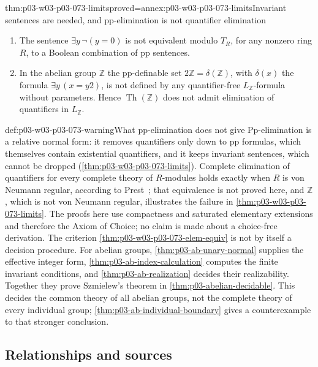 \begin{hbtheorem}{thm:p03-w03-p03-073-limits}{proved=annex:p03-w03-p03-073-limits}{Invariant sentences are needed, and pp-elimination is not quantifier elimination}
\begin{enumerate}
\item The sentence \(\exists y\,\neg(y=0)\) is not equivalent modulo
      \(T_R\), for any nonzero ring \(R\), to a Boolean combination of pp
      sentences.
\item In the abelian group \(\mathbb Z\) the pp-definable set
      \(2\mathbb Z=\delta(\mathbb Z)\), with \(\delta(x)\) the formula
      \(\exists y\,(x=y2)\), is not defined by any quantifier-free
      \(L_{\mathbb Z}\)-formula without parameters. Hence
      \(\operatorname{Th}(\mathbb Z)\) does not admit elimination of
      quantifiers in \(L_{\mathbb Z}\).
\end{enumerate}
\end{hbtheorem}

\begin{hbwarning}{def:p03-w03-p03-073-warning}{What pp-elimination does not give}
Pp-elimination is a relative normal form: it removes quantifiers only down
to pp formulas, which themselves contain existential quantifiers, and it
keeps invariant sentences, which cannot be dropped
(\cref{thm:p03-w03-p03-073-limits}). Complete elimination of quantifiers
for every complete theory of \(R\)-modules holds exactly when \(R\) is von
Neumann regular, according to Prest~\cite[Theorem~5.1]{Prest2020ModelTheoryModules};
that equivalence is not proved here, and \(\mathbb Z\), which is not von
Neumann regular, illustrates the failure in
\cref{thm:p03-w03-p03-073-limits}. The proofs here use compactness and
saturated elementary extensions and therefore the Axiom of Choice; no
claim is made about a choice-free derivation. The criterion
\cref{thm:p03-w03-p03-073-elem-equiv} is not by itself a decision
procedure. For abelian groups, \cref{thm:p03-ab-unary-normal} supplies
the effective integer form, \cref{thm:p03-ab-index-calculation} computes
the finite invariant conditions, and \cref{thm:p03-ab-realization}
decides their realizability. Together they prove Szmielew's theorem in
\cref{thm:p03-abelian-decidable}. This decides the common theory of all
abelian groups, not the complete theory of every individual group;
\cref{thm:p03-ab-individual-boundary} gives a counterexample to that
stronger conclusion.
\end{hbwarning}

\subsection{Relationships and sources}
\label{sec:p03-w03-p03-073-sources}

